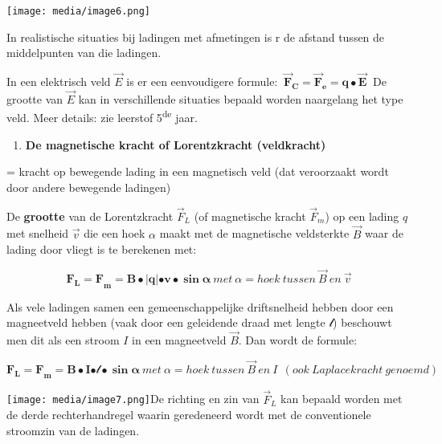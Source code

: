 \documentclass{ximera}
\begin{document}
\texttt{[image: media/image6.png]}

In realistische situaties bij ladingen met afmetingen is r de afstand
tussen de middelpunten van die ladingen.

In een elektrisch veld \(\overrightarrow{E}\) is er een eenvoudigere
formule:
\(\ {\overrightarrow{\mathbf{F}}}_{\mathbf{C}}\mathbf{=}{\overrightarrow{\mathbf{F}}}_{\mathbf{e}}\mathbf{= q \bullet}\overrightarrow{\mathbf{E}}\mathbf{\ }\)
De grootte van \(\overrightarrow{E}\) kan in verschillende situaties
bepaald worden naargelang het type veld. Meer details: zie leerstof
5\textsuperscript{de} jaar.

\begin{enumerate}
\def\labelenumi{\arabic{enumi}.}
\setcounter{enumi}{5}
\item
  \textbf{De magnetische kracht of Lorentzkracht (veldkracht)}
\end{enumerate}

= kracht op bewegende lading in een magnetisch veld (dat veroorzaakt
wordt door andere bewegende ladingen)

De \textbf{grootte} van de Lorentzkracht \({\overrightarrow{F}}_{L}\)
(of magnetische kracht \({\overrightarrow{F}}_{m}\)) op een lading \(q\)
met snelheid \(\overrightarrow{v}\) die een hoek \(\alpha\) maakt met de
magnetische veldsterkte \(\overrightarrow{B}\) waar de lading door
vliegt is te berekenen met:

\[{\mathbf{F}_{\mathbf{L}}\mathbf{= F}}_{\mathbf{m}}\mathbf{= B \bullet}\left| \mathbf{q} \right|\mathbf{\bullet v \bullet}\mathbf{\sin}\mathbf{\alpha}\ met\ \alpha = hoek\ tussen\ \overrightarrow{B}\ en\ \overrightarrow{v}\]

Als vele ladingen samen een gemeenschappelijke driftsnelheid hebben door
een magneetveld hebben (vaak door een geleidende draad met lengte
\(\mathcal{l}\)) beschouwt men dit als een stroom \(I\) in een
magneetveld \(\overrightarrow{B}\). Dan wordt de formule:

\[{\mathbf{F}_{\mathbf{L}}\mathbf{= F}}_{\mathbf{m}}\mathbf{= B \bullet I}\mathcal{\bullet l \bullet}\mathbf{\sin}\mathbf{\alpha}\ met\ \alpha = hoek\ tussen\ \overrightarrow{B}\ en\ I\ \ (ook\ Laplacekracht\ genoemd)\]

\texttt{[image: media/image7.png]}De
richting en zin van \({\overrightarrow{F}}_{L}\) kan bepaald worden met
de derde rechterhandregel waarin geredeneerd wordt met de conventionele
stroomzin van de ladingen.
\end{document}
